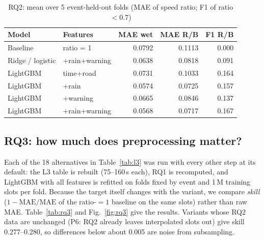 \documentclass[conference]{IEEEtran}
\begin{document}
\begin{table}[t]
\centering
\caption{RQ2: mean over 5 event-held-out folds (MAE of speed ratio; F1 of ratio $<0.7$)}
\label{tab:rq2}
\footnotesize
\begin{tabular}{@{}llrrr@{}}
\toprule
Model & Features & MAE wet & MAE R/B & F1 R/B \\
\midrule
Baseline & ratio = 1 & 0.0792 & 0.1113 & 0.000 \\
Ridge / logistic & +rain+warning & 0.0638 & 0.0818 & 0.091 \\
LightGBM & time+road & 0.0731 & 0.1033 & 0.164 \\
LightGBM & +rain & 0.0574 & 0.0725 & 0.157 \\
LightGBM & +warning & 0.0665 & 0.0846 & 0.137 \\
LightGBM & +rain+warning & 0.0568 & 0.0717 & 0.167 \\
\bottomrule
\end{tabular}
\end{table}

\subsection{RQ3: how much does preprocessing matter?}
\label{sec:rq3}
Each of the 18 alternatives in Table~\ref{tab:l3} was run with every other step at its
default: the L3 table is rebuilt (75--160\,s each), RQ1 is recomputed, and LightGBM with all
features is refitted on folds fixed by event and 1\,M training slots per fold. Because the
target itself changes with the variant, we compare \emph{skill} ($1-\mathrm{MAE}/\mathrm{MAE}$
of the ratio-$=1$ baseline on the same slots) rather than raw MAE. Table~\ref{tab:rq3} and
Fig.~\ref{fig:rq3} give the results. Variants whose RQ2 data are unchanged (P6: RQ2 already
leaves interpolated slots out) give skill 0.277--0.280, so differences below about 0.005 are
noise from subsampling.
\end{document}
